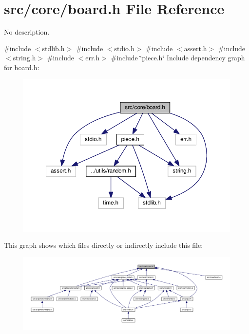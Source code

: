 \section{src/core/board.h File Reference}
\label{board_8h}


No description.  


{\ttfamily \#include $<$stdlib.\+h$>$}\newline
{\ttfamily \#include $<$stdio.\+h$>$}\newline
{\ttfamily \#include $<$assert.\+h$>$}\newline
{\ttfamily \#include $<$string.\+h$>$}\newline
{\ttfamily \#include $<$err.\+h$>$}\newline
{\ttfamily \#include \char`\"{}piece.\+h\char`\"{}}\newline
Include dependency graph for board.\+h\+:
\nopagebreak
\begin{figure}[H]
\begin{center}
\leavevmode
\includegraphics[width=350pt]{board_8h__incl}
\end{center}
\end{figure}
This graph shows which files directly or indirectly include this file\+:
\nopagebreak
\begin{figure}[H]
\begin{center}
\leavevmode
\includegraphics[width=350pt]{board_8h__dep__incl}
\end{center}
\end{figure}
